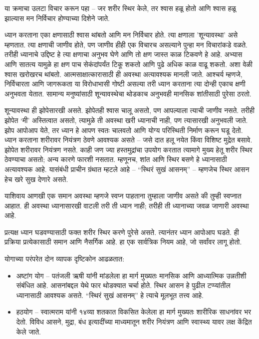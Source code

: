 या क्रमाचा उलटा विचार करून पहा – जर शरीर स्थिर केले, तर श्वास हळू होतो आणि श्वास हळू झाल्यास मन निर्विचार होण्याच्या दिशेने जाते.

ध्यान करताना एका क्षणासाठी श्वास थांबतो आणि मन निर्विचार होते. त्या क्षणाला 'शून्यावस्था' असे म्हणतात. त्या क्षणाची जाणीव होते, पण जाणीव हीही एक विचारच असल्याने पुन्हा मन विचारांकडे वळते. तरीही ध्यानाचे उद्दिष्ट हे त्या क्षणाचा अनुभव घेणे आणि तो क्षण जास्त काळ टिकवणे हे आहे. अभ्यास आणि सातत्य यामुळे हा क्षण पाच सेकंदांपर्यंत टिकू शकतो आणि पुढे अधिक काळ वाढू शकतो. अशा वेळी श्वास खरोखरच थांबतो. आत्मसाक्षात्कारासाठी ही अवस्था अत्यावश्यक मानली जाते. आश्चर्य म्हणजे, निर्विचारता आणि जागरूकता या विरोधाभासी गोष्टी असल्या तरी ध्यान करताना त्या दोन्ही एकाच क्षणी अनुभवता येतात. सामान्य मनुष्यांसाठी शून्यावस्थेचा थोडकाच अनुभवही मानसिक शांतीसाठी पुरेसा ठरतो.

शून्यावस्था ही झोपेसारखी असते. झोपेतही श्वास चालू असतो, पण आपल्याला त्याची जाणीव नसते. तरीही झोपेत ‘मी’ अस्तित्वात असतो, त्यामुळे ती अवस्था खरी ध्यानाची नाही, पण त्यासारखी अनुभवली जाते. झोप आपोआप येते, तर ध्यान हे आपण स्वतः चालवतो आणि योग्य परिस्थिती निर्माण करून घडू देतो. ध्यान करताना शरीरावर नियंत्रण ठेवणे आवश्यक असते – जसे दात हलू नयेत किंवा विशिष्ट मुद्रेत बसावे. झोपेत शरीरावर नियंत्रण नसते. काही जण ज्या हस्तमुद्रांचा उपयोग करतात त्यामागे मुख्य हेतू शरीर स्थिर ठेवण्याचा असतो; अन्य कारणे फारशी नसतात. म्हणूनच, शांत आणि स्थिर बसणे हे ध्यानासाठी अत्यावश्यक आहे. यासंबंधी प्राचीन ग्रंथात म्हटले आहे – “स्थिरं सुखं आसनम्” – म्हणजेच स्थिर आसन हेच खरे सुख देणारे असते.

याशिवाय आणखी एक समान अवस्था म्हणजे स्वप्न पाहताना तुम्हाला जाणीव असते की तुम्ही स्वप्नात आहात. ही अवस्था ध्यानासारखी वाटली तरी ती ध्यान नाही; तरीही ती ध्यानाच्या जवळ जाणारी अवस्था आहे.

प्रत्यक्ष ध्यान घडवण्यासाठी फक्त शरीर स्थिर करणे पुरेसे असते. त्यानंतर ध्यान आपोआप घडते. ही प्रक्रिया प्रत्येकासाठी समान आणि नैसर्गिक आहे. हा एक सार्वत्रिक नियम आहे, जो सर्वांवर लागू होतो.

योगाच्या परंपरेत दोन व्यापक दृष्टिकोन आढळतात:

\begin{itemize}
 \item अष्टांग योग – पतंजली ऋषी यांनी मांडलेला हा मार्ग मुख्यतः मानसिक आणि आध्यात्मिक उन्नतीशी संबंधित आहे. आसनांबद्दल येथे फार थोडक्यात चर्चा होते. स्थिर आसन हे पुढील टप्प्यांतील ध्यानासाठी आवश्यक असते. “स्थिरं सुखं आसनम्” हे त्याचे मूलभूत तत्त्व आहे.
 \item हठयोग – स्वात्मराम यांनी १४व्या शतकात विकसित केलेला हा मार्ग मुख्यतः शारीरिक साधनांवर भर देतो. विविध आसने, मुद्रा, बंध इत्यादींच्या माध्यमातून शरीर नियंत्रण आणि स्वास्थ्य यावर लक्ष केंद्रित केले जाते.
 \end{itemize}
 

